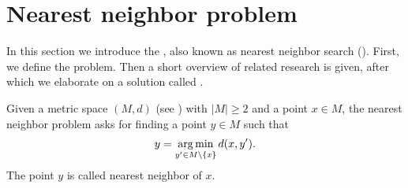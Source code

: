 \chapter{Nearest neighbor problem}\label{nearestNeighborProblem}
	In this section we introduce the \nearestNeighborProblem, also known as nearest neighbor search (\nns).
	First, we define the problem. Then a short overview of related research is given, after which we elaborate on
	a solution called {\coverTree} .
	\begin{mydef}
		Given a metric space $(M, d)$ (see ) with $|M| \ge 2$ and a point $x \in M$,
		the \textnormal{nearest neighbor problem} asks for finding a point $y \in M$ such that
		\begin{align*}
			y = \operatorname*{arg\,min}_{y' \in M \setminus \{x\}} d(x, y').
		\end{align*}
		The point $y$ is called \textnormal{nearest neighbor} of $x$.
	\end{mydef}
